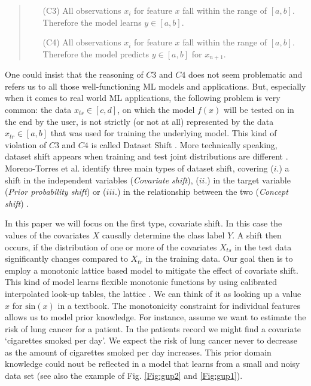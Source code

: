 \begin{quote}
	\begin{itemize}
		\small
		\item[(C3)] All observations $x_i$ for feature $x$ fall within the range of $[a,b]$. Therefore the model learns $y \in [a,b]$. 
		\item[(C4)] All observations $x_i$ for feature $x$ fall within the range of $[a,b]$. Therefore the model predicts $y \in [a,b]$ for $x_{n+1}$.
	\end{itemize}
\end{quote} 
One could insist that the reasoning of $C3$ and $C4$ does not seem problematic and refers us to all those well-functioning ML models and applications. But, especially when it comes to real world ML applications, the following problem is very common: the data $x_{ts} \in [c,d]$, on which the model $f(x)$ will be tested on in the end by the user, is not strictly (or not at all) represented by the data $x_{tr} \in [a,b]$ that was used  for training the underlying model. This kind of violation of $C3$ and $C4$ is called Dataset Shift \citep{moreno2012unifying}. More technically speaking, dataset shift appears when training and test joint distributions are different \citep{quionero2009dataset}. Moreno-Torres et al. identify three main types of dataset shift, covering ($i$.) a shift in the independent variables (\textit{Covariate shift}), ($ii$.) in the target variable (\textit{Prior probability shift}) or ($iii$.) in the relationship between the two (\textit{Concept shift}) .

In this paper we will focus on the first type, covariate shift. In this case the values of the covariates $X$ causally determine the class label $Y$. A shift then occurs, if the distribution of one or more of the covariates $X_{ts}$ in the test data significantly changes compared to $X_{tr}$ in the training data. Our goal then is to employ a monotonic lattice based model to mitigate the effect of covariate shift. This kind of model learns flexible monotonic functions by using calibrated interpolated look-up tables, the lattice \citep{gupta2016monotonic}. We can think of it as looking up a value $x$ for $\mathrm{sin}(x)$ in a textbook. The monotonicity constraint for individual features allows us to model prior knowledge. For instance, assume we want to estimate the risk of lung cancer for a patient. In the patients record we might find a covariate `cigarettes smoked per day'. We expect the risk of lung cancer never to decrease as the amount of cigarettes smoked per day increases. This prior domain knowledge could nout be reflected in a model that learns from a small and noisy data set (see also the example of Fig. \ref{Fig:gup2} and \ref{Fig:gup1}).

